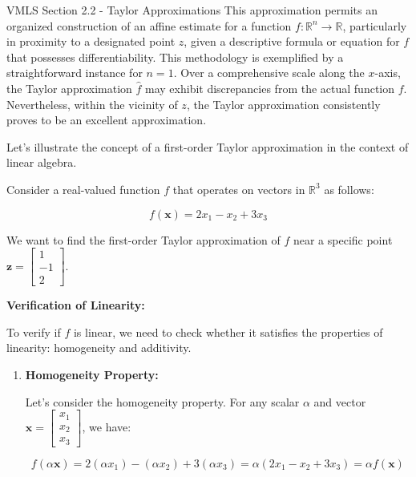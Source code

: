 \begin{notes}{VMLS Section 2.2 - Taylor Approximations}
    This approximation permits an organized construction of an affine estimate for a function $f : \mathbb{R}^n \to \mathbb{R}$, particularly in proximity to a designated point $z$, given a descriptive formula or equation for $f$ that possesses 
    differentiability. This methodology is exemplified by a straightforward instance for $n = 1$. Over a comprehensive scale along the $x$-axis, the Taylor approximation $\hat{f}$ may exhibit discrepancies from the actual function $f$. Nevertheless, 
    within the vicinity of $z$, the Taylor approximation consistently proves to be an excellent approximation.
    
    \begin{highlight}
        Let's illustrate the concept of a first-order Taylor approximation in the context of linear algebra.
        
        
        Consider a real-valued function \(f\) that operates on vectors in \(\mathbb{R}^3\) as follows:
        
        \[f(\mathbf{x}) = 2x_1 - x_2 + 3x_3\]
        
        We want to find the first-order Taylor approximation of \(f\) near a specific point \(\mathbf{z} = \begin{bmatrix} 1 \\ -1 \\ 2 \end{bmatrix}\).
        
        \textbf{Verification of Linearity:} \vspace*{1em}
        
        To verify if \(f\) is linear, we need to check whether it satisfies the properties of linearity: homogeneity and additivity.
        
        \begin{enumerate}
            \item \textbf{Homogeneity Property:}
            
            Let's consider the homogeneity property. For any scalar \(\alpha\) and vector \(\mathbf{x} = \begin{bmatrix} x_1 \\ x_2 \\ x_3 \end{bmatrix}\), we have:
            
            \[f(\alpha\mathbf{x}) = 2(\alpha x_1) - (\alpha x_2) + 3(\alpha x_3) = \alpha(2x_1 - x_2 + 3x_3) = \alpha f(\mathbf{x})\]
            

\end{enumerate}
\end{highlight}
\end{notes}
